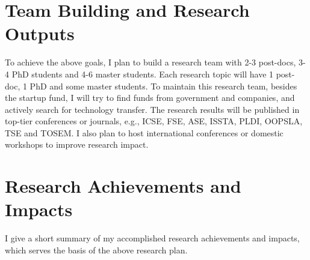 \documentclass[a4paper]{article}
\begin{document}
\section{Team Building and Research Outputs}
To achieve the above goals, I plan to build a research team with 2-3 post-docs, 3-4 PhD students and 4-6 master students. Each research topic will have 1 post-doc, 1 PhD and some master students. To maintain this research team, besides the startup fund, I will try to find funds from government and companies, and actively search for technology transfer.
The research results will be published in top-tier conferences or journals, e.g., ICSE, FSE, ASE, ISSTA, PLDI, OOPSLA, TSE and TOSEM.
I also plan to host international conferences or domestic workshops to improve research impact.

\section{Research Achievements and Impacts}

I give a short summary of my accomplished research achievements and impacts, which serves the basis of the above research plan.
\end{document}
